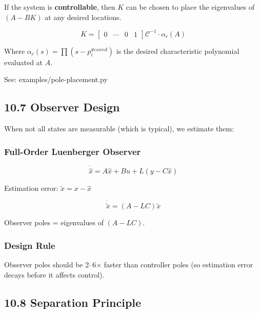 \documentclass[11pt,a4paper]{book}
\begin{document}
If the system is \textbf{controllable}, then $K$ can be chosen to place the eigenvalues of $(A-BK)$ at any desired locations.

\[K = \begin{bmatrix} 0 & \cdots & 0 & 1 \end{bmatrix} \mathcal{C}^{-1} \cdot \alpha_c(A)\]

Where $\alpha_c(s) = \prod(s - p_i^{desired})$ is the desired characteristic polynomial evaluated at $A$.

See: examples/pole-placement.py

\medskip\noindent\hrulefill\medskip

\subsection{10.7 Observer Design}

When not all states are measurable (which is typical), we estimate them:

\subsubsection{Full-Order Luenberger Observer}

\[\dot{\hat{x}} = A\hat{x} + Bu + L(y - C\hat{x})\]

Estimation error: $\tilde{x} = x - \hat{x}$

\[\dot{\tilde{x}} = (A - LC)\tilde{x}\]

Observer poles = eigenvalues of $(A - LC)$.

\subsubsection{Design Rule}
Observer poles should be 2–6× faster than controller poles (so estimation error decays before it affects control).

\medskip\noindent\hrulefill\medskip

\subsection{10.8 Separation Principle}
\end{document}
